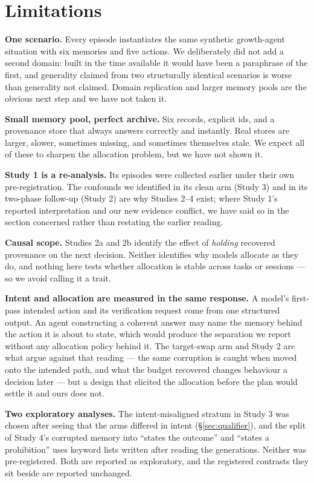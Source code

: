 \section{Limitations}

\textbf{One scenario.} Every episode instantiates the same synthetic
growth-agent situation with six memories and five actions. We deliberately did
not add a second domain: built in the time available it would have been a
paraphrase of the first, and generality claimed from two structurally identical
scenarios is worse than generality not claimed. Domain replication and larger
memory pools are the obvious next step and we have not taken it.

\textbf{Small memory pool, perfect archive.} Six records, explicit ids, and a
provenance store that always answers correctly and instantly. Real stores are
larger, slower, sometimes missing, and sometimes themselves stale. We expect all
of these to sharpen the allocation problem, but we have not shown it.

\textbf{Study 1 is a re-analysis.} Its episodes were collected earlier under
their own pre-registration. The confounds we identified in its clean arm
(Study 3) and in its two-phase follow-up (Study 2) are why Studies 2--4 exist;
where Study 1's reported interpretation and our new evidence conflict, we have
said so in the section concerned rather than restating the earlier reading.

\textbf{Causal scope.} Studies 2a and 2b identify the effect of \emph{holding}
recovered provenance on the next decision. Neither identifies why models
allocate as they do, and nothing here tests whether allocation is stable across
tasks or sessions --- so we avoid calling it a trait.

\textbf{Intent and allocation are measured in the same response.} A model's
first-pass intended action and its verification request come from one structured
output. An agent constructing a coherent answer may name the memory behind the
action it is about to state, which would produce the separation we report without
any allocation policy behind it. The target-swap arm and Study 2 are what argue
against that reading --- the same corruption is caught when moved onto the
intended path, and what the budget recovered changes behaviour a decision later
--- but a design that elicited the allocation before the plan would settle it and
ours does not.

\textbf{Two exploratory analyses.} The intent-misaligned stratum in Study 3 was
chosen after seeing that the arms differed in intent (\S\ref{sec:qualifier}),
and the split of Study 4's corrupted memory into ``states the outcome'' and
``states a prohibition'' uses keyword lists written after reading the
generations. Neither was pre-registered. Both are reported as exploratory, and
the registered contrasts they sit beside are reported unchanged.

